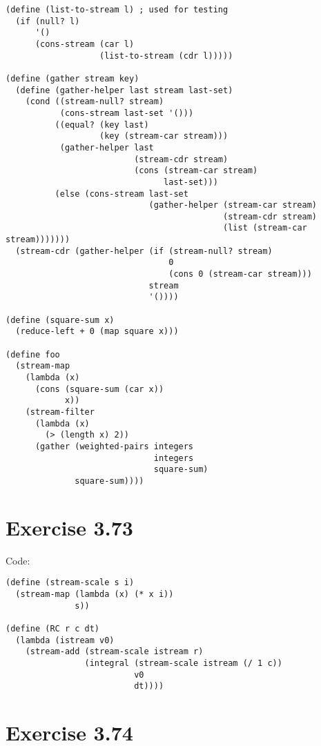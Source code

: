 \documentclass[../main.tex]{subfiles}
\begin{document}
\begin{lstlisting}
(define (list-to-stream l) ; used for testing
  (if (null? l)
      '()
      (cons-stream (car l)
                   (list-to-stream (cdr l)))))

(define (gather stream key)
  (define (gather-helper last stream last-set)
    (cond ((stream-null? stream)
           (cons-stream last-set '()))
          ((equal? (key last)
                   (key (stream-car stream)))
           (gather-helper last
                          (stream-cdr stream)
                          (cons (stream-car stream)
                                last-set)))
          (else (cons-stream last-set
                             (gather-helper (stream-car stream)
                                            (stream-cdr stream)
                                            (list (stream-car stream)))))))
  (stream-cdr (gather-helper (if (stream-null? stream)
                                 0
                                 (cons 0 (stream-car stream)))
                             stream
                             '())))

(define (square-sum x)
  (reduce-left + 0 (map square x)))

(define foo
  (stream-map
    (lambda (x)
      (cons (square-sum (car x))
            x))
    (stream-filter
      (lambda (x)
        (> (length x) 2))
      (gather (weighted-pairs integers
                              integers
                              square-sum)
              square-sum))))
\end{lstlisting}

\section{Exercise 3.73}

Code:

\begin{lstlisting}
(define (stream-scale s i)
  (stream-map (lambda (x) (* x i))
              s))

(define (RC r c dt)
  (lambda (istream v0)
    (stream-add (stream-scale istream r)
                (integral (stream-scale istream (/ 1 c))
                          v0
                          dt))))
\end{lstlisting}

\section{Exercise 3.74}
\end{document}
